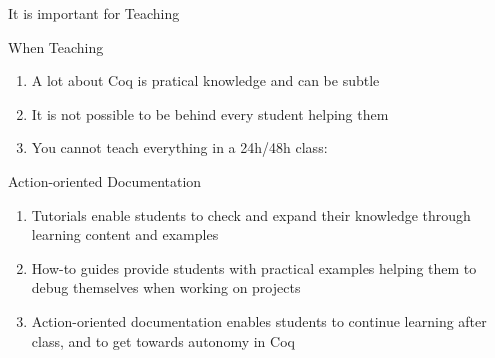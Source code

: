 \documentclass[10pt]{beamer}
\begin{document}
\begin{frame}{It is important for Teaching}
  \begin{tcbProp}{When Teaching}
    \begin{enumerate}
      \item<1-> A lot about Coq is pratical knowledge and can be subtle
      \item<2-> It is not possible to be behind every student helping them
      \item<3-> You cannot teach everything in a 24h/48h class:
    \end{enumerate}
  \end{tcbProp}
  \begin{tcbSol}{Action-oriented Documentation}
    \begin{enumerate}
      \item<5-> Tutorials enable students to check and expand their knowledge
            through learning content and examples
      \item<6-> How-to guides provide students with practical examples helping them
            to debug themselves when working on projects
      \item<7-> Action-oriented documentation enables students to continue
            learning after class, and to get towards autonomy in Coq
    \end{enumerate}
  \end{tcbSol}
\end{frame}
\end{document}
